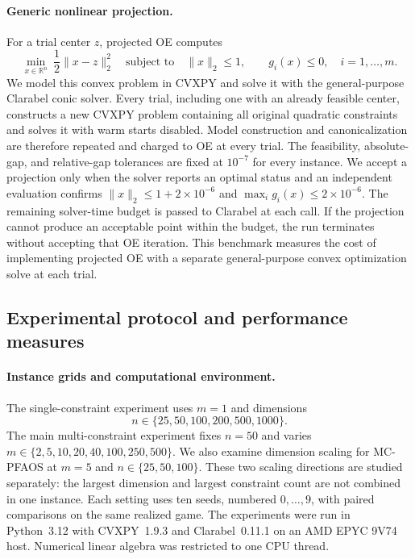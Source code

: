 \paragraph{Generic nonlinear projection.}
For a trial center $z$, projected OE computes
\begin{equation}\label{eq:numerical_generic_projection}
\min_{x\in\mathbb R^n}\ \frac12\|x-z\|_2^2
\quad\text{subject to}\quad
\|x\|_2\le1,\qquad g_i(x)\le0,\quad i=1,\ldots,m.
\end{equation}
We model this convex problem in CVXPY and solve it with the general-purpose
Clarabel conic solver. Every trial, including one with an already feasible
center, constructs a new CVXPY problem containing all original quadratic
constraints and solves it with warm starts disabled. Model construction and
canonicalization are therefore repeated and charged to OE at every trial. The feasibility, absolute-gap,
and relative-gap tolerances are fixed at $10^{-7}$ for every instance.
We accept a projection only when the solver reports an optimal status
and an independent evaluation confirms
$\|x\|_2\le1+2\times10^{-6}$ and
$\max_i g_i(x)\le2\times10^{-6}$. The remaining solver-time budget is
passed to Clarabel at each call. If the projection cannot produce an
acceptable point within the budget, the run terminates without accepting
that OE iteration. This benchmark measures the cost of implementing
projected OE with a separate general-purpose convex optimization solve
at each trial.

\subsection{Experimental protocol and performance measures}
\label{subsec:numerical_protocol}

\paragraph{Instance grids and computational environment.}
The single-constraint experiment uses $m=1$ and dimensions
\[
n\in\{25,50,100,200,500,1000\}.
\]
The main multi-constraint
experiment fixes $n=50$ and varies
$m\in\{2,5,10,20,40,100,250,500\}$. We also examine dimension scaling
for MC-PFAOS at $m=5$ and $n\in\{25,50,100\}$. These two scaling
directions are studied separately: the largest dimension and largest
constraint count are not combined in one instance. Each setting uses
ten seeds, numbered $0,\ldots,9$, with paired comparisons on the same
realized game. The experiments were run in Python~3.12 with CVXPY~1.9.3
and Clarabel~0.11.1 on an AMD EPYC 9V74 host. Numerical linear algebra
was restricted to one CPU thread.

